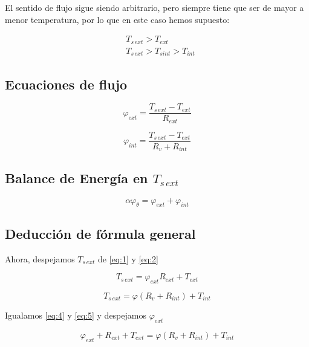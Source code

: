 \documentclass[11pt]{article}
\begin{document}
El sentido de flujo sigue siendo arbitrario, pero siempre tiene que ser de mayor a menor temperatura, por lo que en este caso hemos supuesto:

\[ \begin{aligned} 
    & T_{ s \, ext } > T_{ ext } \\
    & T_{ s \, ext } > T_{ s int } > T_{ int }
\end{aligned} \]

\subsection{Ecuaciones de flujo}

\begin{equation}\label{eq:1}
    \varphi _{ ext } = \frac{ T_{ s \, ext } - T_{ ext } }{ R_{ ext } }
\end{equation}

\begin{equation}\label{eq:2}
    \varphi _{ int } = \frac{ T_{ s \, ext } - T_{ ext } }{ R_v + R_{ int } }
\end{equation}

\subsection{Balance de Energía en $ T_{ s \, ext } $}

\begin{equation}\label{eq:3}
    \alpha \varphi _\theta = \varphi _{ ext } + \varphi _{ int }
\end{equation}

\subsection{Deducción de fórmula general}

Ahora, despejamos $ T_{ s \, ext } $ de \ref{eq:1} y \ref{eq:2}

\begin{equation} \label{eq:4}
    T_{ s \, ext} = \varphi _{ ext } R_{ ext } + T_{ ext }
\end{equation}

\begin{equation} \label{eq:5}
    T_{ s \, ext } = \varphi \left( R_v + R_{ int } \right) + T_{ int }
\end{equation}

Igualamos \ref{eq:4} y \ref{eq:5} y despejamos $ \varphi _{ ext } $

\[ \varphi _{ ext } + R_{ ext } + T_{ ext } = \varphi \left( R_v + R_{ int } \right) + T_{ int } \]
\end{document}
